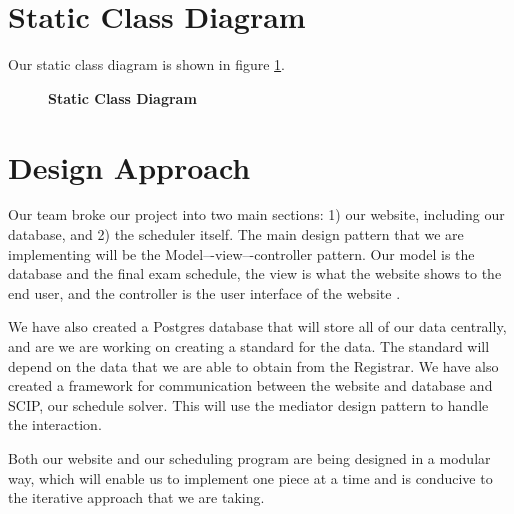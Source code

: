 \documentclass[11pt]{article}
\begin{document}
\section{Static Class Diagram}  %
Our static class diagram is shown in figure \ref{fig:staticDiagram}.

\begin{figure}
	\centering
	\caption{\bf Static Class Diagram}
	\label{fig:staticDiagram}
\end{figure}


\section{ Design Approach}  %

Our team broke our project into two main sections: 1) our website, including our database, and 2) the scheduler itself. The main design pattern that we are implementing will be the 
Model–-view–-controller  %
pattern. Our model is the database and the final exam schedule, the view is what the website shows to the end user, and the controller is the user interface of the website . 

 We have also created a Postgres database that will store all of our data centrally, and are we are working on creating a standard for the data.  The standard will depend on the data that we are able to obtain from the Registrar.  We have also created a framework for communication between the website and database and SCIP, our schedule solver. This will use the mediator design pattern to handle the interaction. 

Both our website and our scheduling program are being designed in a modular way, which will enable us to implement one piece at a time and is conducive to the iterative approach that we are taking.


\end{document}
